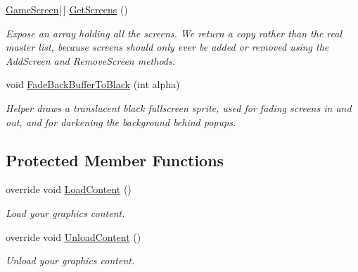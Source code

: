 \begin{DoxyCompactItemize}
\hyperlink{classCityMania_1_1GameScreen}{GameScreen}\mbox{[}$\,$\mbox{]} \hyperlink{classCityMania_1_1ScreenManager_adcd1bf4bd14623016140047118beb92b}{GetScreens} ()
\begin{DoxyCompactList}\small\item\em Expose an array holding all the screens. We return a copy rather than the real master list, because screens should only ever be added or removed using the AddScreen and RemoveScreen methods. \item\end{DoxyCompactList}\item 
void \hyperlink{classCityMania_1_1ScreenManager_a38cabc3f8bad9e348abf1a37353640e0}{FadeBackBufferToBlack} (int alpha)
\begin{DoxyCompactList}\small\item\em Helper draws a translucent black fullscreen sprite, used for fading screens in and out, and for darkening the background behind popups. \item\end{DoxyCompactList}\end{DoxyCompactItemize}
\subsection*{Protected Member Functions}
\begin{DoxyCompactItemize}
\item 
override void \hyperlink{classCityMania_1_1ScreenManager_a4bab9e90789258c162e5c2ab78aa9c67}{LoadContent} ()
\begin{DoxyCompactList}\small\item\em Load your graphics content. \item\end{DoxyCompactList}\item 
override void \hyperlink{classCityMania_1_1ScreenManager_ae95f2d781bf379d7d5a81d1f31b776f4}{UnloadContent} ()
\begin{DoxyCompactList}\small\item\em Unload your graphics content. \item\end{DoxyCompactList}\end{DoxyCompactItemize}
